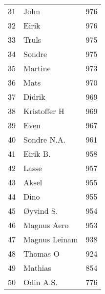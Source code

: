 \begin{longtable}{|r|l|r|}
31 &                 John &   976 \\
32 &                Eirik &   976 \\
33 &                Truls &   975 \\
34 &               Sondre &   975 \\
35 &              Martine &   973 \\
36 &                 Mats &   970 \\
37 &               Didrik &   969 \\
38 &         Kristoffer H &   969 \\
39 &                 Even &   967 \\
40 &          Sondre N.A. &   961 \\
41 &             Eirik B. &   958 \\
42 &                Lasse &   957 \\
43 &                Aksel &   955 \\
44 &                 Dino &   955 \\
45 &            Øyvind S. &   954 \\
46 &          Magnus Aero &   953 \\
47 &        Magnus Leinam &   938 \\
48 &             Thomas O &   924 \\
49 &              Mathias &   854 \\
50 &            Odin A.S. &   776 \\
\end{longtable}
